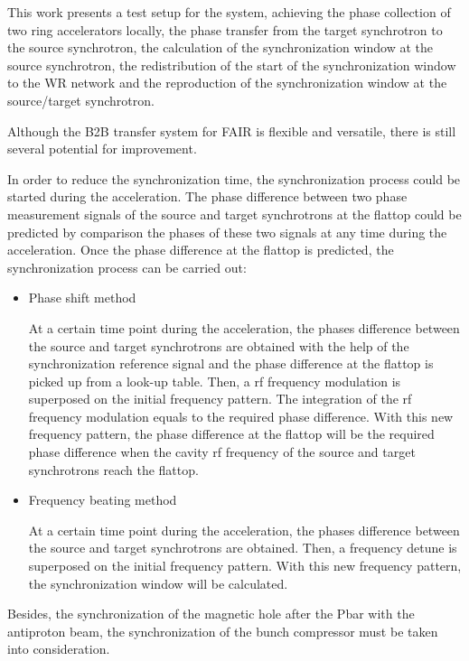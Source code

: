 This work presents a test setup for the system, achieving the phase collection of two ring accelerators locally, the phase transfer from the target synchrotron to the source synchrotron, the calculation of the synchronization window at the source synchrotron, the redistribution of the start of the synchronization window to the WR network and the reproduction of the synchronization window at the source/target synchrotron. 

Although the B2B transfer system for FAIR is flexible and versatile, there is still several potential for improvement. 

In order to reduce the synchronization time, the synchronization process could be started during the acceleration. The phase difference between two phase measurement signals of the source and target synchrotrons at the flattop could be predicted by comparison the phases of these two signals at any time during the acceleration. Once the phase difference at the flattop is predicted, the synchronization process can be carried out: 
\begin{itemize}
	\item Phase shift method

At a certain time point during the acceleration, the phases difference between the source and target synchrotrons are obtained with the help of the synchronization reference signal and the phase difference at the flattop is picked up from a look-up table. Then, a rf frequency modulation is superposed on the initial frequency pattern. The integration of the rf frequency modulation equals to the required phase difference. With this new frequency pattern, the phase difference at the flattop will be the required phase difference when the cavity rf frequency of the source and target synchrotrons reach the flattop. 
	\item Frequency beating method

At a certain time point during the acceleration, the phases difference between the source and target synchrotrons are obtained. Then, a frequency detune is superposed on the initial frequency pattern. With this new frequency pattern, the synchronization window will be calculated. 
\end{itemize}

Besides, the synchronization of the magnetic hole after the Pbar with the antiproton beam, the synchronization of the bunch compressor must be taken into consideration.